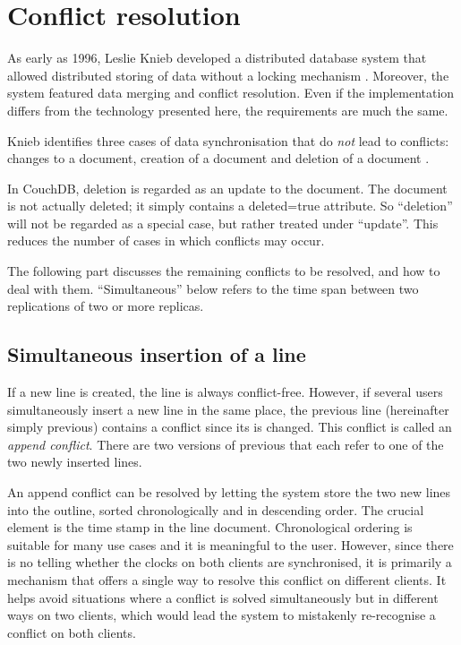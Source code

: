 \section{Conflict resolution}
\label{sec:konfliktbehandlung}

As early as 1996, Leslie Knieb developed a distributed database system that allowed distributed storing of data without a locking mechanism . Moreover, the system featured data merging and conflict resolution. Even if the implementation differs from the technology presented here, the requirements are much the same.

Knieb identifies three cases of data synchronisation that do \textit{not} lead to conflicts: changes to a document, creation of a document and deletion of a document .

In CouchDB, deletion is regarded as an update to the document. The document is not actually deleted; it simply contains a {\selectfont deleted=true} attribute. So \enquote{deletion} will not be regarded as a special case, but rather treated under \enquote{update}. This reduces the number of cases in which conflicts may occur.

The following part discusses the remaining conflicts to be resolved, and how to deal with them. \enquote{Simultaneous} below refers to the time span between two replications of two or more replicas.

\subsection{Simultaneous insertion of a line}
\label{subsec:appendkonfl-arch}

If a new line is created, the line is always conflict-free. However, if several users simultaneously insert a new line in the same place, the previous line (hereinafter simply {\selectfont previous}) contains a conflict since its  is changed. This conflict is called an \textit{append conflict}. There are two versions of {\selectfont previous} that each refer to one of the two newly inserted lines.

An append conflict can be resolved by letting the system store the two new lines into the outline, sorted chronologically and in descending order. The crucial element is the time stamp in the line document. Chronological ordering is suitable for many use cases and it is meaningful to the user. However, since there is no telling whether the clocks on both clients are synchronised, it is primarily a mechanism that offers a single way to resolve this conflict on different clients. It helps avoid situations where a conflict is solved simultaneously but in different ways on two clients, which would lead the system to mistakenly re-recognise a conflict on both clients.

